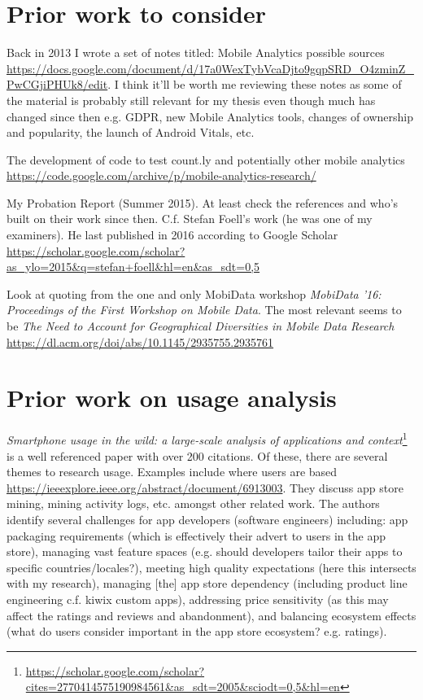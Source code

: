 \section{Prior work to consider}
Back in 2013 I wrote a set of notes titled: Mobile Analytics possible sources \url{https://docs.google.com/document/d/17a0WexTybVcaDjto9gqpSRD_O4zminZ_PwCGjiPHUk8/edit}. I think it'll be worth me reviewing these notes as some of the material is probably still relevant for my thesis even though much has changed since then e.g. GDPR, new Mobile Analytics tools, changes of ownership and popularity, the launch of Android Vitals, etc.

The development of code to test count.ly and potentially other mobile analytics \url{https://code.google.com/archive/p/mobile-analytics-research/}

My Probation Report (Summer 2015). At least check the references and who's built on their work since then. C.f. Stefan Foell's work (he was one of my examiners). He last published in 2016 according to Google Scholar \url{https://scholar.google.com/scholar?as_ylo=2015&q=stefan+foell&hl=en&as_sdt=0,5}

Look at quoting from the one and only MobiData workshop \emph{MobiData '16: Proceedings of the First Workshop on Mobile Data}. The most relevant seems to be \emph{The Need to Account for Geographical Diversities in Mobile Data Research} \url{https://dl.acm.org/doi/abs/10.1145/2935755.2935761}

\section{Prior work on usage analysis}
\emph{Smartphone usage in the wild: a large-scale analysis of applications and context}\footnote{\url{https://scholar.google.com/scholar?cites=2770414575190984561\&as_sdt=2005\&sciodt=0,5\&hl=en}} is a well referenced paper with over 200 citations. Of these, there are several themes to research usage. Examples include where users are based \href{Investigating Country Differences in Mobile App User Behavior and Challenges for Software Engineering}{https://ieeexplore.ieee.org/abstract/document/6913003}. They discuss app store mining, mining activity logs, etc. amongst other related work. The authors identify several challenges for app developers (software engineers) including: app packaging requirements (which is effectively their advert to users in the app store), managing vast feature spaces (e.g. should developers tailor their apps to specific countries/locales?), meeting high quality expectations (here this intersects with my research), managing [the] app store dependency (including product line engineering c.f. kiwix custom apps), addressing price sensitivity (as this may affect the ratings and reviews and abandonment), and balancing ecosystem effects (what do users consider important in the app store ecosystem? e.g. ratings).

